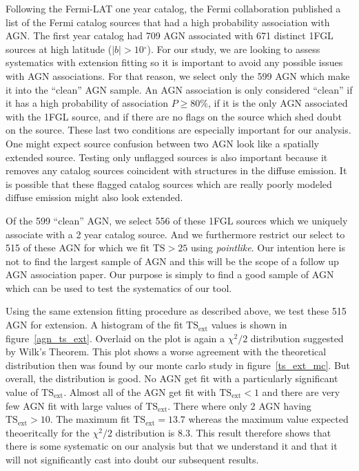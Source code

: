 \documentclass[preprint]{aastex}
\newcommand{\tsext}{\ensuremath{\text{TS}_\text{ext}}\xspace}
\newcommand{\ts}{\text{TS}\xspace}
\renewcommand{\deg}{\ensuremath{^\circ}\xspace}
\newcommand{\pointlike}{{\em pointlike}\xspace}
\begin{document}
Following the Fermi-LAT one year catalog, the Fermi collaboration
published a list of the Fermi catalog sources that had a high probability
association with AGN. The first year catalog had 709 AGN associated with
671 distinct 1FGL sources at high latitude ($|b|>10\deg$).  For our
study, we are looking to assess systematics with extension fitting so
it is important to avoid any possible issues with AGN associations.
For that reason, we select only the 599 AGN which make it into the
``clean'' AGN sample. An AGN association is only considered ``clean''
if it has a high probability of association $P\ge 80\%$, if it is the
only AGN associated with the 1FGL source, and if there are no flags
on the source which shed doubt on the source\cite{1FGL}. These last two
conditions are especially important for our analysis. One might expect
source confusion between two AGN look like a spatially extended source.
Testing only unflagged sources is also important because it removes
any catalog sources coincident with structures in the diffuse emission.
It is possible that these flagged catalog sources which are really poorly
modeled diffuse emission might also look extended.

Of the 599 ``clean'' AGN, we select 556 of these 1FGL sources which
we uniquely associate with a 2 year catalog source. And we furthermore
restrict our select to 515 of these AGN for which we fit $\ts>25$ using
\pointlike.  Our intention here is not to find the largest sample of
AGN and this will be the scope of a follow up AGN association paper. Our
purpose is simply to find a good sample of AGN which can be used to
test the systematics of our tool.

Using the same extension fitting procedure as described above, we
test these 515 AGN for extension. A histogram of the fit \tsext values
is shown in figure~\ref{agn_ts_ext}. Overlaid on the plot is again a
$\chi^2/2$ distribution suggested by Wilk's Theorem.  This plot shows
a worse agreement with the theoretical distribution then was found
by our monte carlo study in figure~\ref{ts_ext_mc}.  But overall, the
distribution is good. No AGN get fit with a particularly significant
value of $\tsext$. Almost all of the AGN get fit with $\tsext<1$ and
there are very few AGN fit with large values of \tsext.  There where
only 2 AGN having $\tsext>10$.  The maximum fit $\tsext=13.7$ whereas the
maximum value expected theoeritcally for the $\chi^2/2$ distribution is
8.3. This result therefore shows that there is some systematic on our
analysis but that we understand it and that it will not significantly
cast into doubt our subsequent results.
\end{document}
